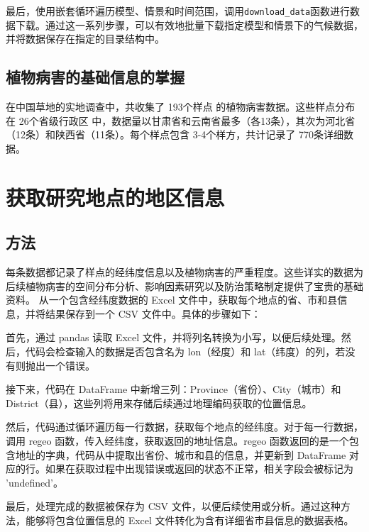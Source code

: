 \documentclass[AutoFakeBold]{LZUThesis-PgD&PhD}
\begin{document}
    最后，使用嵌套循环遍历模型、情景和时间范围，调用\texttt{download\_data}函数进行数据下载。通过这一系列步骤，可以有效地批量下载指定模型和情景下的气候数据，并将数据保存在指定的目录结构中。
    
    
        \subsection{植物病害的基础信息的掌握}
        在中国草地的实地调查中，共收集了 193个样点 的植物病害数据。这些样点分布在 26个省级行政区 中，数据量以甘肃省和云南省最多（各13条），其次为河北省（12条）和陕西省（11条）。每个样点包含 3-4个样方，共计记录了 770条详细数据。
   
   
   
   	\section{获取研究地点的地区信息}
   	
   		\subsection{方法}
        每条数据都记录了样点的经纬度信息以及植物病害的严重程度。这些详实的数据为后续植物病害的空间分布分析、影响因素研究以及防治策略制定提供了宝贵的基础资料。
        从一个包含经纬度数据的 Excel 文件中，获取每个地点的省、市和县信息，并将结果保存到一个 CSV 文件中。具体的步骤如下：
        
        首先，通过 pandas 读取 Excel 文件，并将列名转换为小写，以便后续处理。然后，代码会检查输入的数据是否包含名为 lon（经度）和 lat（纬度）的列，若没有则抛出一个错误。
        
        接下来，代码在 DataFrame 中新增三列：Province（省份）、City（城市）和 District（县），这些列将用来存储后续通过地理编码获取的位置信息。
        
        然后，代码通过循环遍历每一行数据，获取每个地点的经纬度。对于每一行数据，调用 regeo 函数，传入经纬度，获取返回的地址信息。regeo 函数返回的是一个包含地址的字典，代码从中提取出省份、城市和县的信息，并更新到 DataFrame 对应的行。如果在获取过程中出现错误或返回的状态不正常，相关字段会被标记为 'undefined'。
        
        最后，处理完成的数据被保存为 CSV 文件，以便后续使用或分析。通过这种方法，能够将包含位置信息的 Excel 文件转化为含有详细省市县信息的数据表格。
\end{document}
